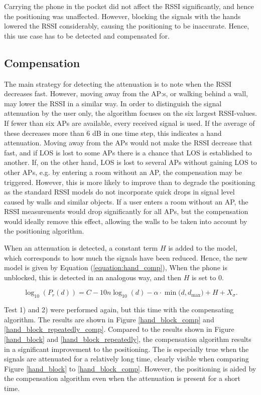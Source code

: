 \documentclass{LTHthesis}
\begin{document}
%
Carrying the phone in the pocket did not affect the RSSI significantly, and hence the positioning was unaffected. However, blocking the signals with the hands lowered the RSSI considerably, causing the positioning to be inaccurate. Hence, this use case has to be detected and compensated for.

\subsection{Compensation}

The main strategy for detecting the attenuation is to note when the RSSI decreases fast. However, moving away from the AP:s, or walking behind a wall, may lower the RSSI in a similar way. In order to distinguish the signal attenuation by the user only, the algorithm focuses on the six largest RSSI-values. If fewer than six APs are available, every received signal is used. If the average of these decreases more than 6 dB in one time step, this indicates a hand attenuation. Moving away from the APs would not make the RSSI decrease that fast, and if LOS is lost to some APs there is a chance that LOS is established to another. If, on the other hand, LOS is lost to several APs without gaining LOS to other APs, e.g. by entering a room without an AP, the compensation may be triggered. However, this is more likely to improve than to degrade the positioning as the standard RSSI models do not incorporate quick drops in signal level caused by walls and similar objects. If a user enters a room without an AP, the RSSI measurements would drop significantly for all APs, but the compensation would ideally remove this effect, allowing the walls to be taken into account by the positioning algorithm. 

When an attenuation is detected, a constant term $H$ is added to the model, which corresponds to how much the signals have been reduced. Hence, the new model is given by Equation (\ref{equation:hand_comp}),  When the phone is unblocked, this is detected in an analogous way, and then $H$ is set to 0. 

\begin{equation}
\log_{10}({P_r(d)})=C-10n\log_{10}(d) - \alpha\cdot\min({d, d_{\text{max}})}+H+ X_\sigma.
\label{equation:hand_comp}
\end{equation}

Test 1) and 2) were performed again, but this time with the compensating algorithm. The results are shown in Figure \ref{hand_block_comp} and \ref{hand_block_repeatedly_comp}. Compared to the results shown in Figure \ref{hand_block} and \ref{hand_block_repeatedly}, the compensation algorithm results in a significant improvement to the positioning. The is especially true when the signals are attenuated for a relatively long time, clearly visible when comparing Figure \ref{hand_block} to \ref{hand_block_comp}. However, the positioning is aided by the compensation algorithm even when the attenuation is present for a short time.  
\end{document}
